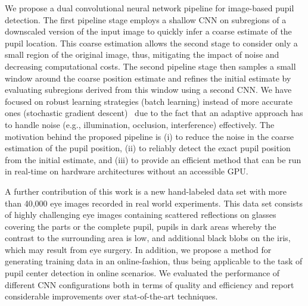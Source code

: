 We propose a dual convolutional neural network pipeline for image-based pupil detection. The first pipeline stage employs a shallow CNN on subregions of a downscaled version of the input image to quickly infer a coarse
estimate of the pupil location. This coarse estimation allows the
second stage to consider only a small region of the original image, thus, mitigating the impact of noise and decreasing computational costs.
The second pipeline stage then samples a small window around the coarse position
estimate and refines the initial estimate by evaluating
subregions derived from this window using a second CNN. We have focused on
robust learning strategies (batch learning) instead of more accurate ones
(stochastic gradient descent)~\citet{lecun2012efficient} due to the fact that an
adaptive approach has to handle noise (e.g., illumination, occlusion,
interference) effectively. The motivation behind the proposed pipeline is (i) to reduce the noise in the coarse estimation of the pupil position, (ii) to reliably detect the exact pupil position from the initial estimate, and (iii) to provide an efficient method that can be run in real-time on hardware architectures without an accessible GPU.

A further contribution of this work is a new hand-labeled data set with more
than 40,000 eye images recorded in real world experiments. This data set
consists of highly challenging eye images containing scattered reflections on
glasses covering the parts or the complete pupil, pupils in dark areas whereby
the contrast to the surrounding area is low, and additional black blobs on the
iris, which may result from eye surgery.
In addition, we propose a method for generating training data in an online-fashion, thus being applicable to the task of pupil center detection in online scenarios. We evaluated the performance of different CNN configurations both in terms of quality and efficiency and report considerable improvements over stat-of-the-art techniques.

